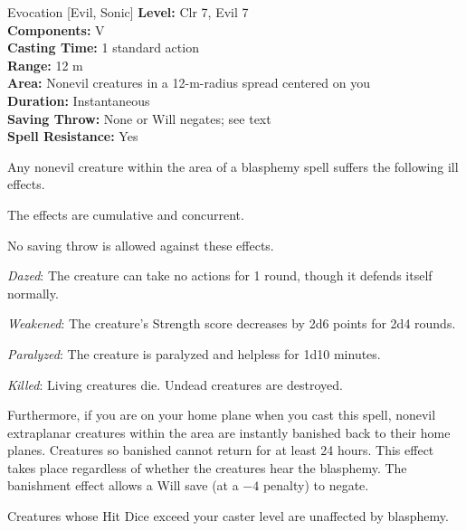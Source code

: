 {Evocation [Evil, Sonic]}
{
	\textbf{Level:}
	Clr 7, Evil 7\\
	\textbf{Components:}
	V\\
	\textbf{Casting Time:}
	1 standard action\\
	\textbf{Range:}
	12 m\\
	\textbf{Area:}
	Nonevil creatures in a 12-m-radius spread centered on you\\
	\textbf{Duration:}
	Instantaneous\\
	\textbf{Saving Throw:}
	None or Will negates; see text\\
	\textbf{Spell Resistance:}
	Yes\\
}
{
	Any nonevil creature within the area of a blasphemy spell suffers the following ill effects.


	The effects are cumulative and concurrent.

	No saving throw is allowed against these effects.

	\textit{Dazed}:
	The creature can take no actions for 1 round, though it defends itself normally.

	\textit{Weakened}:
	The creature's Strength score decreases by 2d6 points for 2d4 rounds.

	\textit{Paralyzed}:
	The creature is paralyzed and helpless for 1d10 minutes.

	\textit{Killed}:
	Living creatures die. Undead creatures are destroyed.

	Furthermore, if you are on your home plane when you cast this spell, nonevil extraplanar creatures within the area are instantly banished back to their home planes. Creatures so banished cannot return for at least 24 hours. This effect takes place regardless of whether the creatures hear the blasphemy. The banishment effect allows a Will save (at a $-4$ penalty) to negate.

	Creatures whose Hit Dice exceed your caster level are unaffected by blasphemy.

}
